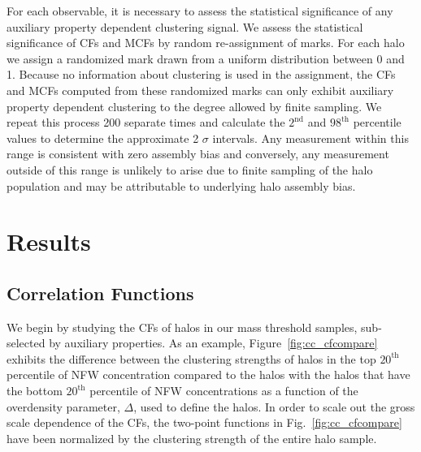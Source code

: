 \documentclass[usenatbib,fleqn]{mnras}
\begin{document}
For each observable, it is necessary to assess the statistical significance of any auxiliary property dependent clustering signal. We assess the statistical significance of CFs and MCFs by random re-assignment of marks. For each halo we assign a randomized mark drawn from a uniform distribution between 0 and 1. Because no information about clustering is used in the assignment, the CFs and MCFs computed from these randomized marks can only exhibit auxiliary property dependent clustering to the degree allowed by finite sampling. We repeat this process 200 separate times and calculate the $2^{\mathrm{nd}}$ and $98^{\mathrm{th}}$ percentile values to determine the approximate 2 $\sigma$ intervals. Any measurement within this range is consistent with zero assembly bias and conversely, any measurement outside of this range is unlikely to arise due to finite sampling of the halo population and may be attributable to underlying halo assembly bias.


\section[]{Results}
\label{section:results}


\subsection{Correlation Functions}
\label{sub:cfresults}

We begin by studying the CFs of halos in our mass threshold samples, sub-selected by auxiliary properties. As an example, Figure~\ref{fig:cc_cfcompare} exhibits the difference between the clustering strengths of halos in the top $20^{\mathrm{th}}$ percentile of NFW concentration compared to the halos with the halos that have the
bottom $20^{\mathrm{th}}$ percentile of NFW concentrations as a function of the overdensity parameter, $\Delta$, used to define the halos. In order to scale out the gross scale dependence of the CFs, the two-point functions in Fig.~\ref{fig:cc_cfcompare} have been normalized by the clustering strength of the entire halo sample. 
\end{document}
